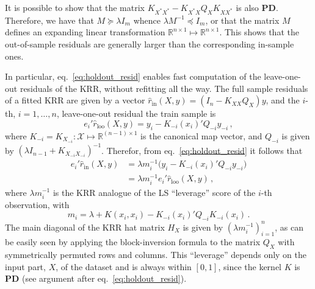 \documentclass{ITaSconf}
\newcommand{\Xcal}{\mathcal{X}}
\newcommand{\Real}{\mathbb{R}}
\begin{document}
It is possible to show that the matrix $K_{X^*X^*} - K_{X^*X} Q_X K_{XX^*}$ is also
\textbf{PD}. Therefore, we have that $M \succeq \lambda I_m$ whence $\lambda M^{-1}
\preceq I_m$, or that the matrix $M$ defines an expanding linear transformation
$\Real^{n\times 1} \mapsto \Real^{n\times 1}$. This shows that the out-of-sample
residuals are generally larger than the corresponding in-sample ones.

In particular, eq.~\ref{eq:holdout_resid} enables fast computation of the leave-one-out
residuals of the KRR, without refitting all the way. The full sample residuals of a
fitted KRR are given by a vector $\hat{r}_{\text{in}}(X, y) = (I_n - K_{XX} Q_X) y$,
and the $i$-th, $i=1,\ldots, n$, leave-one-out residual the train sample is
\begin{equation}
  e_i' \hat{r}_{\text{loo}}(X, y)
  = y_i - K_{-i}(x_i)' Q_{-i} y_{-i} \,,
\end{equation}
where $K_{-i} = K_{X_{-i}}: \Xcal \mapsto \Real^{(n-1)\times1}$ is the canonical map
vector, and $Q_{-i}$ is given by $(\lambda I_{n-1} + K_{X_{-i}X_{-i}})^{-1}$.
Therefor, from eq.~\ref{eq:holdout_resid} it follows that
\begin{align}
  e_i' \hat{r}_{\text{in}}(X, y)
  &= \lambda m_i^{-1} \bigl(y_i - K_{-i}(x_i)' Q_{-i} y_{-i} \bigr) \nonumber \\
  &= \lambda m_i^{-1} e_i' \hat{r}_{\text{loo}}(X, y) \label{eq:loo_resid} \,,
\end{align}
where $\lambda m_i^{-1}$ is the KRR analogue of the LS ``leverage'' score of the
$i$-th observation, with
\begin{equation*}
  m_i = \lambda + K(x_i, x_i) - K_{-i}(x_i)' Q_{-i} K_{-i}(x_i) \,.
\end{equation*}
The main diagonal of the KRR hat matrix $H_X$ is given by $(\lambda m_i^{-1})_{i=1}^n$,
as can be easily seen by applying the block-inversion formula to the matrix $Q_X$
with symmetrically permuted rows and columns. This ``leverage'' depends only on the
input part, $X$, of the dataset and is always within $[0, 1]$, since the kernel $K$
is \textbf{PD} (see argument after eq.~\ref{eq:holdout_resid}).
\end{document}
